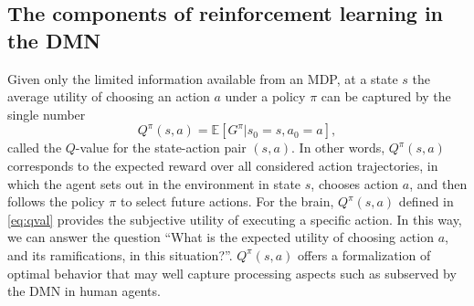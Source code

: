 \documentclass[10pt,letterpaper]{article}
\def\V{\mathbf{V}}
\begin{document}
\subsection{The components of reinforcement learning in the DMN}
Given only the limited information available from an MDP, at a state $s$ the average
utility of choosing an action $a$ under a policy $\pi$ can be captured by the single number
\begin{equation}
  \label{eq:qval}
  Q^{\pi}(s,a) = \mathbb E [G^\pi|s_0=s,a_0=a],
\end{equation}
called the $Q$-value for the state-action pair $(s,a)$.
In other words, $Q^{\pi}(s,a)$ corresponds to the expected reward
over all considered action trajectories, in which
the agent sets out in the environment in state
$s$, chooses action $a$, and then follows the policy $\pi$ to select future actions.
For the brain,
$Q^{\pi}(s, a)$ defined in \eqref{eq:qval} provides the subjective
utility of executing a specific action.
In this way, we can answer the question
``What is the expected utility of choosing action $a$, and its ramifications, in this situation?''.
$Q^{\pi}(s,a)$ offers a formalization of optimal behavior that
may well capture processing aspects such as subserved by the DMN in human agents.



\end{document}
